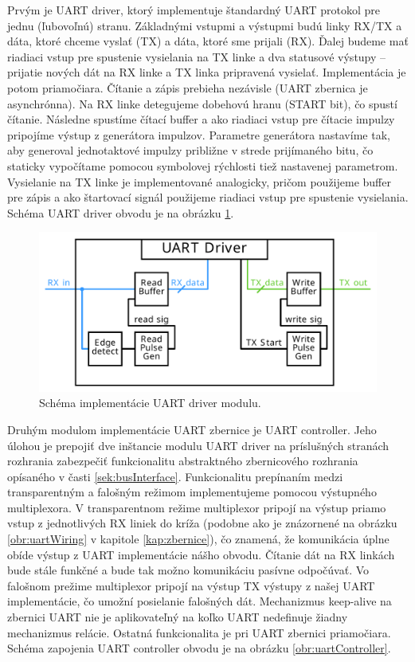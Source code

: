 Prvým je UART driver, ktorý implementuje štandardný UART protokol pre jednu (ľubovoľnú) stranu. Základnými vstupmi a výstupmi budú linky RX/TX a dáta, ktoré chceme vyslať (TX) a dáta, ktoré sme prijali (RX). Ďalej budeme mať riadiaci vstup pre spustenie vysielania na TX linke a dva statusové výstupy -- prijatie nových dát na RX linke a TX linka pripravená vysielať. Implementácia je potom priamočiara. Čítanie a zápis prebieha nezávisle (UART zbernica je asynchrónna). Na RX linke detegujeme dobehovú hranu (START bit), čo spustí čítanie. Následne spustíme čítací buffer a ako riadiaci vstup pre čítacie impulzy pripojíme výstup z generátora impulzov. Parametre generátora nastavíme tak, aby generoval jednotaktové impulzy približne v strede prijímaného bitu, čo staticky vypočítame pomocou symbolovej rýchlosti tiež nastavenej parametrom. Vysielanie na TX linke je implementované analogicky, pričom použijeme buffer pre zápis a ako štartovací signál použijeme riadiaci vstup pre spustenie vysielania. Schéma UART driver obvodu je na obrázku \ref{obr:uartDriver}.

\begin{figure}
    \centerline{\includegraphics[width=1\textwidth]{images/designs/uartDriver.pdf}}
    \caption[Schéma implementácie UART driver modulu]{Schéma implementácie UART driver modulu.}
    \label{obr:uartDriver}
\end{figure}

Druhým modulom implementácie UART zbernice je UART controller. Jeho úlohou je prepojiť dve inštancie modulu UART driver na príslušných stranách rozhrania zabezpečiť funkcionalitu abstraktného zbernicového rozhrania opísaného v časti \ref{sek:busInterface}. Funkcionalitu prepínaním medzi transparentným a falošným režimom implementujeme pomocou výstupného multiplexora. V transparentnom režime multiplexor pripojí na výstup priamo vstup z jednotlivých RX liniek do kríža (podobne ako je znázornené na obrázku \ref{obr:uartWiring} v kapitole \ref{kap:zbernice}), čo znamená, že komunikácia úplne obíde výstup z UART implementácie nášho obvodu. Čítanie dát na RX linkách bude stále funkčné a bude tak možno komunikáciu pasívne odpočúvať. Vo falošnom prežime multiplexor pripojí na výstup TX výstupy z našej UART implementácie, čo umožní posielanie falošných dát. Mechanizmus keep-alive na zbernici UART nie je aplikovateľný na koľko UART nedefinuje žiadny mechanizmus relácie. Ostatná funkcionalita je pri UART zbernici priamočiara. Schéma zapojenia UART controller obvodu je na obrázku \ref{obr:uartController}.

